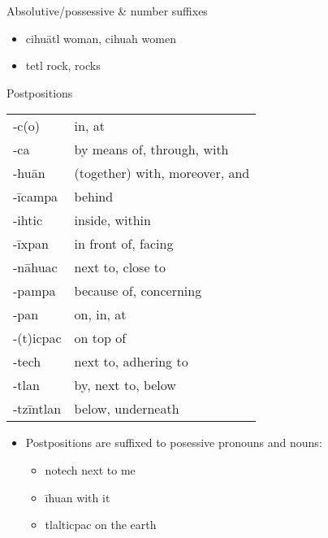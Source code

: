 \documentclass[12pt]{beamer}
\newcommand{\nah}[1]{\textcolor{nahgrn}{#1}}
\newcommand{\trs}[1]{\textcolor{nahblu}{#1}}
\begin{document}
\begin{frame}
\begin{columns}[t]
\begin{column}{.23\linewidth}
\begin{block}{Absolutive/possessive \& number suffixes}
\begin{itemize}
\begin{itemize}
                  \item \nah{cihuātl} \trs{woman}, \nah{cihuah} \trs{women}
                  \item \nah{tetl} \trs{rock, rocks}
                \end{itemize}
        \end{itemize}
      \end{block}
      \begin{block}{Postpositions}
        \begin{tabular}{ll}
          \nah{-c(o)}     & \trs{in, at}                         \\
          \nah{-ca}       & \trs{by means of, through, with}     \\
          \nah{-huān}     & \trs{(together) with, moreover, and} \\
          \nah{-īcampa}   & \trs{behind}                         \\
          \nah{-ihtic}    & \trs{inside, within}                 \\
          \nah{-īxpan}    & \trs{in front of, facing}            \\
          \nah{-nāhuac}   & \trs{next to, close to}              \\
          \nah{-pampa}    & \trs{because of, concerning}         \\
          \nah{-pan}      & \trs{on, in, at}                     \\
          \nah{-(t)icpac} & \trs{on top of}                      \\
          \nah{-tech}     & \trs{next to, adhering to}           \\
          \nah{-tlan}     & \trs{by, next to, below}             \\
          \nah{-tzīntlan} & \trs{below, underneath}              \\
        \end{tabular}%
        \begin{itemize}
          \item Postpositions are suffixed to posessive pronouns and nouns:
                \begin{itemize}
                  \item \nah{notech} \trs{next to me}
                  \item \nah{īhuan} \trs{with it}
                  \item \nah{tlalticpac} \trs{on the earth}
                \end{itemize}

\end{itemize}
\end{block}
\end{column}
\end{columns}
\end{frame}
\end{document}
